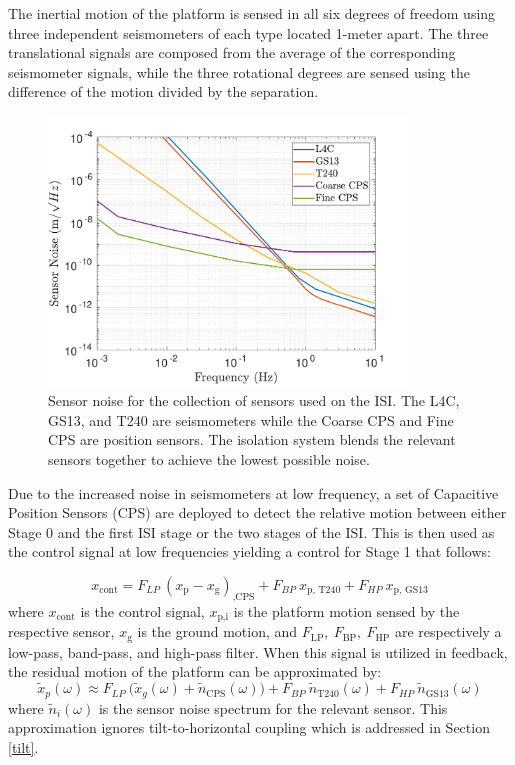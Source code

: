 \documentclass [12pt, proquest]{uwthesis}[2019]
\begin{document}
The inertial motion of the platform is sensed in all six degrees of freedom using three independent seismometers of each type located 1-meter apart. The three translational signals are composed from the average of the corresponding seismometer signals, while the three rotational degrees are sensed using the difference of the motion divided by the separation.

\begin{figure}[!h]
\begin{center}
\includegraphics[width=0.85\textwidth]{seismicSensNoise.pdf}
\caption[Sensor noise for the seismic isolation system]{Sensor noise for the collection of sensors used on the ISI. The L4C, GS13, and T240 are seismometers while the Coarse CPS and Fine CPS are position sensors. The isolation system blends the relevant sensors together to achieve the lowest possible noise.}
\label{seisNoise}
\end{center}
\end{figure}

Due to the increased noise in seismometers at low frequency, a set of Capacitive Position Sensors (CPS) are deployed to detect the relative motion between either Stage 0 and the first ISI stage or the two stages of the ISI. This is then used as the control signal at low frequencies yielding a control for Stage 1 that follows:

\begin{equation}
x_\text{cont}=F_{LP}\ (x_\text{p}-x_\text{g})_\text{,CPS}+F_{BP}\ x_\text{p, T240}+F_{HP}\ x_\text{p, GS13}
\end{equation}
where $x_\text{cont}$ is the control signal, $x_\text{p,i}$ is the platform motion sensed by the respective sensor, $x_\text{g}$ is the ground motion, and $F_\text{LP},\  F_\text{BP},\ F_\text{HP}$ are respectively a low-pass, band-pass, and high-pass filter. When this signal is utilized in feedback, the residual motion of the platform can be approximated by:
\begin{equation}
\tilde{x}_p(\omega)\approx F_{LP}\ \big(\tilde{x}_g(\omega)+\tilde{n}_\text{CPS}(\omega)\big)+F_{BP}\ \tilde{n}_\text{T240}(\omega)+F_{HP}\ \tilde{n}_\text{GS13}(\omega)
\end{equation}
where $\tilde{n}_{i}(\omega)$ is the sensor noise spectrum for the relevant sensor. This approximation ignores tilt-to-horizontal coupling which is addressed in Section \ref{tilt}.
\end{document}
